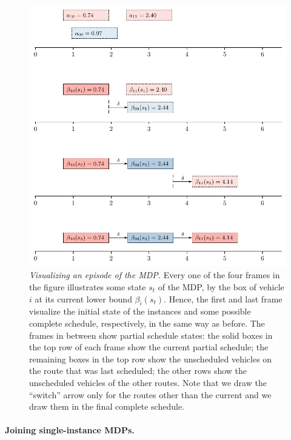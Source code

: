 \documentclass[a4paper]{report}
\theoremstyle{definition}
\theoremstyle{plain}
\begin{document}
\begin{figure}
  \centering
  \includegraphics[scale=1]{../single/figures/episode.pdf}
  \caption{\emph{Visualizing an episode of the MDP.} Every one of the four frames in
    the figure illustrates some state $s_t$ of the MDP, by the box of vehicle
    $i$ at its current lower bound $\beta_i(s_t)$.
    Hence, the first and last frame visualize the initial state of the instances
    and some possible complete schedule, respectively, in the same way as
    before. The frames in between show partial schedule states: the solid boxes
    in the top row of each frame show the current partial schedule; the
    remaining boxes in the top row show the unscheduled vehicles on the route
    that was last scheduled; the other rows show the unscheduled vehicles of the
    other routes. Note that we draw the ``switch'' arrow only for the routes other
    than the current and we draw them in the final complete
    schedule.}\label{fig:mdp-episode}
\end{figure}



\paragraph{Joining single-instance MDPs.}
\end{document}
